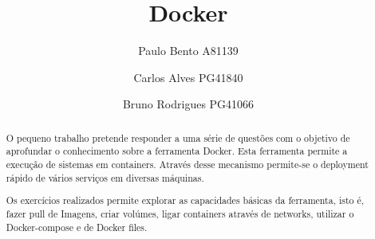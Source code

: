 

\title{Docker}

\author{Paulo Bento A81139 \and Carlos Alves PG41840 \and Bruno Rodrigues PG41066}




\maketitle

\begin{abstract}

O pequeno trabalho pretende responder a uma série de questões com o objetivo de aprofundar o conhecimento sobre a ferramenta Docker. Esta ferramenta permite a execução de sistemas em containers. Através desse mecanismo permite-se o deployment rápido de vários serviços em diversas máquinas.

Os exercícios realizados permite explorar as capacidades básicas da ferramenta, isto é, fazer pull de Imagens, criar volúmes, ligar containers através de networks, utilizar o Docker-compose e de Docker files. 

\end{abstract}
\newpage

